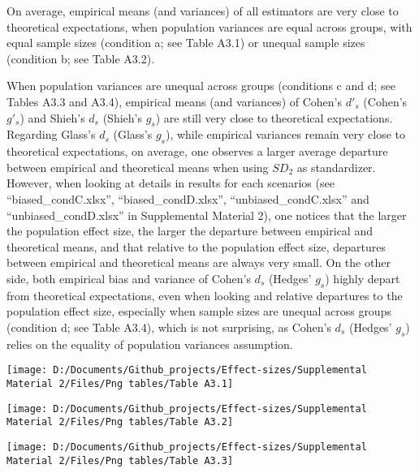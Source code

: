 \documentclass[
  man]{apa6}
\begin{document}
On average, empirical means (and variances) of all estimators are very close to theoretical expectations, when population variances are equal across groups, with equal sample sizes (condition a; see Table A3.1) or unequal sample sizes (condition b; see Table A3.2).

When population variances are unequal across groups (conditions c and d; see Tables A3.3 and A3.4), empirical means (and variances) of Cohen's \(d'_s\) (Cohen's \(g'_s\)) and Shieh's \(d_s\) (Shieh's \(g_s\)) are still very close to theoretical expectations. Regarding Glass's \(d_s\) (Glass's \(g_s\)), while empirical variances remain very close to theoretical expectations, on average, one observes a larger average departure between empirical and theoretical means when using \(SD_2\) as standardizer. However, when looking at details in results for each scenarios (see \enquote{biased\_condC.xlsx}, \enquote{biased\_condD.xlsx}, \enquote{unbiased\_condC.xlsx} and \enquote{unbiased\_condD.xlsx} in Supplemental Material 2), one notices that the larger the population effect size, the larger the departure between empirical and theoretical means, and that relative to the population effect size, departures between empirical and theoretical means are always very small. On the other side, both empirical bias and variance of Cohen's \(d_s\) (Hedges' \(g_s\)) highly depart from theoretical expectations, even when looking and relative departures to the population effect size, especially when sample sizes are unequal across groups (condition d; see Table A3.4), which is not surprising, as Cohen's \(d_s\) (Hedges' \(g_s\)) relies on the equality of population variances assumption.

\begin{sidewaysfigure}

{\centering \texttt{[image: D:/Documents/Github\_projects/Effect-sizes/Supplemental Material 2/Files/Png tables/Table A3.1]} 

}

\end{sidewaysfigure}

\begin{sidewaysfigure}

{\centering \texttt{[image: D:/Documents/Github\_projects/Effect-sizes/Supplemental Material 2/Files/Png tables/Table A3.2]} 

}

\end{sidewaysfigure}

\begin{sidewaysfigure}

{\centering \texttt{[image: D:/Documents/Github\_projects/Effect-sizes/Supplemental Material 2/Files/Png tables/Table A3.3]} 

}

\end{sidewaysfigure}
\end{document}
